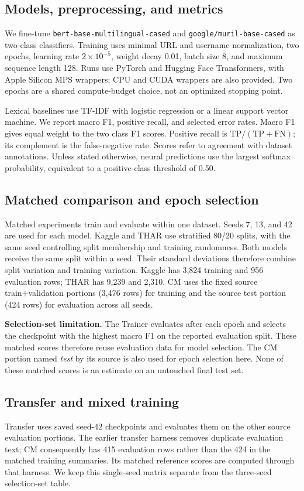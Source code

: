 \documentclass[11pt,a4paper]{article}
\begin{document}
\subsection{Models, preprocessing, and metrics}
We fine-tune \texttt{bert-base-multilingual-cased} and
\texttt{google/muril-base-cased} as two-class classifiers. Training uses
minimal URL and username normalization, two epochs, learning rate
$2\times10^{-5}$, weight decay 0.01, batch size 8, and maximum sequence
length 128. Runs use PyTorch and Hugging Face Transformers, with Apple
Silicon MPS wrappers; CPU and CUDA wrappers are also provided. Two epochs
are a shared compute-budget choice, not an optimized stopping point.

Lexical baselines use TF-IDF with logistic regression or a linear support
vector machine. We report macro F1, positive recall, and selected error
rates. Macro F1 gives equal weight to the two class F1 scores. Positive
recall is $\mathrm{TP}/(\mathrm{TP}+\mathrm{FN})$; its complement is the
false-negative rate. Scores refer to agreement with dataset annotations.
Unless stated otherwise, neural predictions use the largest softmax
probability, equivalent to a positive-class threshold of 0.50.

\subsection{Matched comparison and epoch selection}
Matched experiments train and evaluate within one dataset. Seeds 7, 13,
and 42 are used for each model. Kaggle and THAR use stratified 80/20
splits, with the same seed controlling split membership and training
randomness. Both models receive the same split within a seed. Their
standard deviations therefore combine split variation and training
variation. Kaggle has 3,824 training and 956 evaluation rows; THAR has
9,239 and 2,310. CM uses the fixed source train+validation portions
(3,476 rows) for training and the source test portion (424 rows) for
evaluation across all seeds.

\textbf{Selection-set limitation.} The Trainer evaluates after each epoch
and selects the checkpoint with the highest macro F1 on the reported
evaluation split. These matched scores therefore reuse evaluation data
for model selection. The CM portion named \emph{test} by its source is also
used for epoch selection here. None of these matched scores is an estimate
on an untouched final test set.

\subsection{Transfer and mixed training}
Transfer uses saved seed-42 checkpoints and evaluates them on the other
source evaluation portions. The earlier transfer harness removes duplicate
evaluation text; CM consequently has 415 evaluation rows rather than the
424 in the matched training summaries. Its matched reference scores are
computed through that harness. We keep this single-seed matrix separate
from the three-seed selection-set table.
\end{document}
